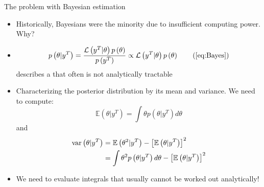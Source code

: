 \begin{frame}{The problem with Bayesian estimation}
\begin{itemize}
    \item Historically, Bayesians were the minority due to insufficient computing power. Why?
    \item
        \begin{equation}
            p\left( {\theta |{y^T}} \right) = \frac{\mathcal{L}\left( {{y^T}|\theta } \right)p\left( \theta  \right)}{p\left( y^T \right)} \propto \mathcal{L}\left( {{y^T}|\theta } \right)p\left( \theta  \right) \tag{\ref{eq:Bayes}}
        \end{equation}
        describes a  that often is not analytically tractable
    \item Characterizing the posterior distribution by its mean and variance. We need to compute:
    \begin{equation}
    \mathbb{E}\left( {\theta |{y^T}} \right) = \int {\theta p\left( {\theta |{y^T}} \right)d\theta }
    \end{equation}
    and
    \begin{align}
      \operatorname{var} \left( {\theta |{y^T}} \right) &= \mathbb{E}\left( {{\theta ^2}|{y^T}} \right) - {\left[ {\mathbb{E}\left( {\theta |{y^T}} \right)} \right]^2} \notag \\
       &= \int {{\theta ^2}p\left( {\theta |{y^T}} \right)d\theta }  - {\left[ {\mathbb{E}\left( {\theta |{y^T}} \right)} \right]^2}
    \end{align}
    \item We need to evaluate integrals that usually cannot be worked out analytically!
    \end{itemize}
\end{frame}

